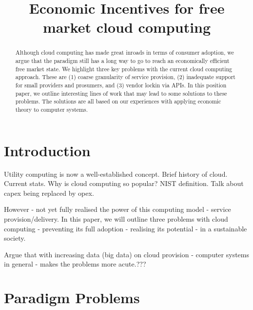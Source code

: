 \documentclass[conference,10pt]{IEEEtran}
\begin{document}
\title{Economic Incentives for free market cloud computing}


\author{
}

\maketitle


\begin{abstract}
Although cloud computing has made great inroads in terms of consumer adoption, we argue that the paradigm still has a long way to go to reach an economically efficient free market state.
We highlight three key problems with the current cloud computing approach. These are (1) coarse granularity of service provision, (2) inadequate support for small providers and prosumers, and (3) vendor lockin via APIs.
In this position paper, we outline interesting lines of work that may lead to some solutions to these problems. The solutions are all based on our experiences with applying economic theory to computer systems.
\end{abstract}


\section{Introduction}

Utility computing is now a well-established concept. Brief history of cloud.
Current stats. Why is cloud computing so popular? NIST definition. Talk about capex being replaced by opex.

However - not yet fully realised the power of this computing model - service provision/delivery. In this paper, we will outline three problems with cloud computing - preventing its full adoption - realising its potential - in a sustainable society.

Argue that with increasing data (big data) on cloud provision - computer systems in general - makes the problems more acute.???


\section{Paradigm Problems}
\end{document}
